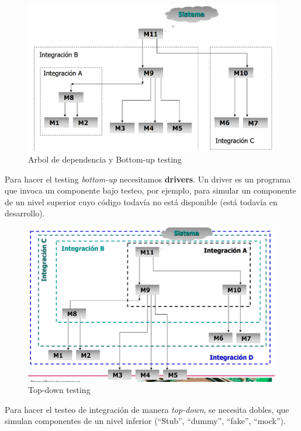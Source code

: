 \begin{figure}[htbp]
	\centering
	\includegraphics{images/03/bottomup.png}
	\caption{Arbol de dependencia y Bottom-up testing}
	\label{fig:03/bottomup}
\end{figure}

Para hacer el testing \textit{bottom-up} necesitamos \textbf{drivers}.
Un driver es un programa que invoca un componente bajo testeo, por ejemplo, para simular un componente de un nivel superior cuyo código todavía no está disponible (está todavía en desarrollo).

\begin{figure}[htbp]
	\centering
	\includegraphics{images/03/topdown.png}
	\caption{Top-down testing}
	\label{fig:03/topdown}
\end{figure}

Para hacer el testeo de integración de manera \textit{top-down}, se
necesita dobles, que simulan componentes de un nivel inferior (``Stub'', ``dummy'', ``fake'', ``mock'').
\ns

